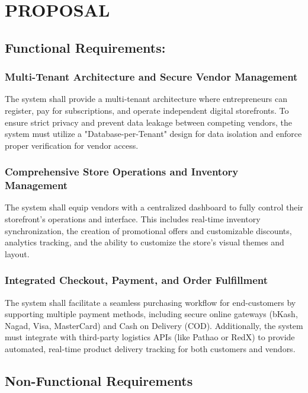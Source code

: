 \chapter{PROPOSAL} \label{ch:procedure}

\section{Functional Requirements:}

\subsection{Multi-Tenant Architecture and Secure Vendor Management}
The system shall provide a multi-tenant architecture where entrepreneurs can register, pay for subscriptions, and operate independent digital storefronts. To ensure strict privacy and prevent data leakage between competing vendors, the system must utilize a "Database-per-Tenant" design for data isolation and enforce proper verification for vendor access.



\subsection{Comprehensive Store Operations and Inventory Management}
The system shall equip vendors with a centralized dashboard to fully control their storefront's operations and interface. This includes real-time inventory synchronization, the creation of promotional offers and customizable discounts, analytics tracking, and the ability to customize the store's visual themes and layout.


\subsection{Integrated Checkout, Payment, and Order Fulfillment}
The system shall facilitate a seamless purchasing workflow for end-customers by supporting multiple payment methods, including secure online gateways (bKash, Nagad, Visa, MasterCard) and Cash on Delivery (COD). Additionally, the system must integrate with third-party logistics APIs (like Pathao or RedX) to provide automated, real-time product delivery tracking for both customers and vendors.


\section{Non-Functional Requirements}

